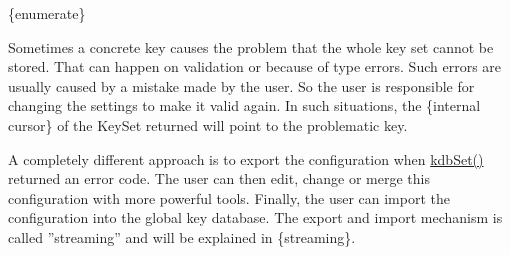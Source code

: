 \{enumerate\}

Sometimes a concrete key causes the problem that the whole key set cannot be stored. That can happen on validation or because of type errors. Such errors are usually caused by a mistake made by the user. So the user is responsible for changing the settings to make it valid again. In such situations, the \{internal cursor\} of the {\ttfamily Key\+Set} {\ttfamily returned} will point to the problematic key.

A completely different approach is to export the configuration when {\ttfamily \hyperlink{group__kdb_ga11436b058408f83d303ca5e996832bcf}{kdb\+Set()}} returned an error code. The user can then edit, change or merge this configuration with more powerful tools. Finally, the user can import the configuration into the global key database. The export and import mechanism is called ''streaming'' and will be explained in \{streaming\}. 